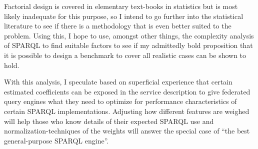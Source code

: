 \documentclass{llncs}
\begin{document}
Factorial design is covered in elementary text-books in
statistics but is most likely inadequate for this purpose, so I intend
to go further into the statistical literature to see if there is a
methodology that is even better suited to the problem. Using
this, I hope to use, amongst other things, the complexity analysis of
SPARQL to find suitable factors to see if my admittedly bold
proposition that it is possible to design a benchmark to cover all
realistic cases can be shown to hold.

With this analysis, I speculate based on superficial experience that
certain estimated coefficients can be exposed in the service
description to give federated query engines what they need to optimize
for performance characteristics of certain SPARQL
implementations. Adjusting how different features are weighed will
help those who know details of their expected SPARQL use and
normalization-techniques of the weights will answer the special case
of ``the best general-purpose SPARQL engine''.


%

\end{document}
